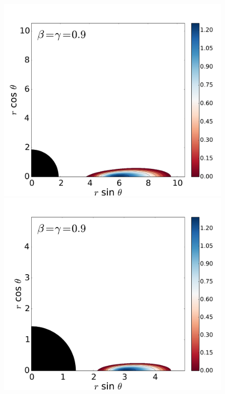 \documentclass[]{aa}
\begin{document}
\begin{figure}
\includegraphics[scale=0.14]{figures/fig2_3_1.pdf}
\hspace{-0.3cm}
\includegraphics[scale=0.14]{figures/fig2_3_2.pdf}
\hspace{-0.2cm}

\end{figure}
\end{document}
